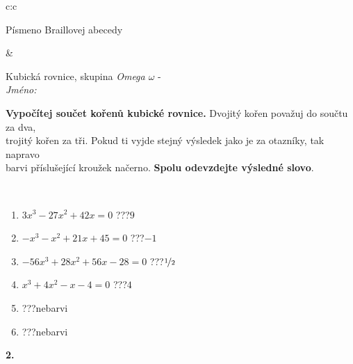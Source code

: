 \documentclass[10pt]{report}
\begin{document}
\begin{tabular}{c:c}
\begin{minipage}[c][104.5mm][t]{0.5\linewidth}
\begin{center}
\begin{minipage}{0.20\linewidth}
\begin{center}
{\small Písmeno Braillovej abecedy}
\end{center}
\end{minipage}
\end{center}
\end{minipage}
&
\begin{minipage}[c][104.5mm][t]{0.5\linewidth}
\begin{center}
\vspace{7mm}
{\huge Kubická rovnice, skupina \textit{Omega $\omega$} -}\\[5mm]
\textit{Jméno:}\phantom{xxxxxxxxxxxxxxxxxxxxxxxxxxxxxxxxxxxxxxxxxxxxxxxxxxxxxxxxxxxxxxxxx}\\[5mm]
\begin{minipage}{0.95\linewidth}
\begin{center}
\textbf{Vypočítej součet kořenů kubické rovnice.} Dvojitý kořen považuj do součtu za dva,\\trojitý kořen za tři. Pokud ti vyjde stejný výsledek jako je za otazníky, tak napravo\\barvi příslušející kroužek načerno. \textbf{Spolu odevzdejte výsledné slovo}.
\end{center}
\end{minipage}
\\[1mm]
\begin{minipage}{0.79\linewidth}
\begin{center}
\begin{varwidth}{\linewidth}
\begin{enumerate}
\Large
\item $3x^3-27x^2+42x=0$\quad \dotfill\; ???\;\dotfill \quad $9$
\item $-x^3-x^2+21x+45=0$\quad \dotfill\; ???\;\dotfill \quad $-1$
\item $-56x^3+28x^2+56x-28=0$\quad \dotfill\; ???\;\dotfill \quad $\nicefrac{1}{2}$
\item $x^3+4x^2-x-4=0$\quad \dotfill\; ???\;\dotfill \quad $4$
\item \quad \dotfill\; ???\;\dotfill \quad nebarvi
\item \quad \dotfill\; ???\;\dotfill \quad nebarvi
\end{enumerate}
\end{varwidth}
\end{center}
\end{minipage}
\begin{minipage}{0.20\linewidth}
\begin{center}
{\Huge\bfseries 2.} \\[2mm]

\end{center}
\end{minipage}
\end{center}
\end{minipage}
\end{tabular}
\end{document}
